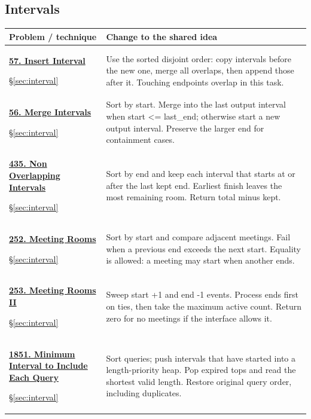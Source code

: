 \documentclass[11pt]{article}
\newcommand{\sect}[1]{\hyperref[sec:#1]{\S\ref*{sec:#1}}}
\begin{document}
\subsection{Intervals}
\begin{longtable}{@{}L{4.3cm}L{11.7cm}@{}}
\toprule Problem / technique & Change to the shared idea \\ \midrule\endhead
\hypertarget{lc57}{}\href{https://leetcode.com/problems/insert-interval/}{\textbf{57. Insert Interval}}\par\sect{interval} & Use the sorted disjoint order: copy intervals before the new one, merge all overlaps, then append those after it. Touching endpoints overlap in this task.\\[4pt]
\hypertarget{lc56}{}\href{https://leetcode.com/problems/merge-intervals/}{\textbf{56. Merge Intervals}}\par\sect{interval} & Sort by start. Merge into the last output interval when start <= last\_end; otherwise start a new output interval. Preserve the larger end for containment cases.\\[4pt]
\hypertarget{lc435}{}\href{https://leetcode.com/problems/non-overlapping-intervals/}{\textbf{435. Non Overlapping Intervals}}\par\sect{interval} & Sort by end and keep each interval that starts at or after the last kept end. Earliest finish leaves the most remaining room. Return total minus kept.\\[4pt]
\hypertarget{lc252}{}\href{https://leetcode.com/problems/meeting-rooms/}{\textbf{252. Meeting Rooms}}\par\sect{interval} & Sort by start and compare adjacent meetings. Fail when a previous end exceeds the next start. Equality is allowed: a meeting may start when another ends.\\[4pt]
\hypertarget{lc253}{}\href{https://leetcode.com/problems/meeting-rooms-ii/}{\textbf{253. Meeting Rooms II}}\par\sect{interval} & Sweep start +1 and end -1 events. Process ends first on ties, then take the maximum active count. Return zero for no meetings if the interface allows it.\\[4pt]
\hypertarget{lc1851}{}\href{https://leetcode.com/problems/minimum-interval-to-include-each-query/}{\textbf{1851. Minimum Interval to Include Each Query}}\par\sect{interval} & Sort queries; push intervals that have started into a length-priority heap. Pop expired tops and read the shortest valid length. Restore original query order, including duplicates.\\[4pt]
\bottomrule
\end{longtable}
\end{document}
